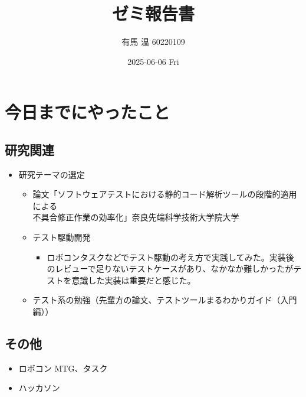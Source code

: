 \documentclass[uplatex, onecolumn, 10pt]{jsarticle}
\begin{document}
\title{\vspace{-40mm}\bf{\LARGE{ゼミ報告書}}}
\author{\vspace{-40mm}有馬 温 60220109}
\date{2025-06-06 Fri}
\maketitle


\section{今日までにやったこと}

\subsection*{研究関連} 
\begin{itemize}
	\item 研究テーマの選定
		\begin{itemize}
			\item 論文「ソフトウェアテストにおける静的コード解析ツールの段階的適用による\\
            不具合修正作業の効率化」奈良先端科学技術大学院大学 
        \end{itemize}
        \begin{itemize}
			\item テスト駆動開発
			\begin{itemize}
                \item ロボコンタスクなどでテスト駆動の考え方で実践してみた。実装後のレビューで足りないテストケースがあり、なかなか難しかったがテストを意識した実装は重要だと感じた。
            \end{itemize}
        \end{itemize}
        \begin{itemize}
			\item テスト系の勉強（先輩方の論文、テストツールまるわかりガイド（入門編））
        \end{itemize}
\end{itemize}

\subsection*{その他}
\begin{itemize}
	\item ロボコン MTG、タスク
	\item ハッカソン
\end{itemize}
\end{document}
